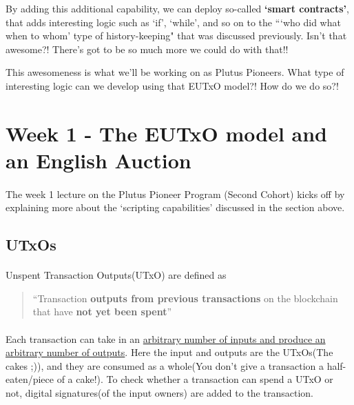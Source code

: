 \documentclass[a4paper, 11pt]{article}
\begin{document}
\begin{description}
        By adding this additional capability, we can deploy so-called \textbf{`smart contracts'}, that adds interesting logic such as `if', `while', and so on to the ```who did what when to whom' type of history-keeping" that was discussed previously. Isn't that awesome?! There's got to be so much more we could do with that!!

        This awesomeness is what we'll be working on as Plutus Pioneers. What type of interesting logic can we develop using that EUTxO model?! How do we do so?! 
    \end{description}
    


    \vspace{20px}
    \section{Week 1 - The EUTxO model and an English Auction}

    \paragraph{} The week 1 lecture on the Plutus Pioneer Program (Second Cohort) kicks off by explaining more about the `scripting capabilities' discussed in the section above.

    \subsection{UTxOs}
    \paragraph{} Unspent Transaction Outputs(UTxO) are defined as 

    \begin{quotation}
        ``Transaction \textbf{outputs from previous transactions} on the blockchain that have \textbf{not yet been spent}''
    \end{quotation}

    \paragraph{} Each transaction can take in an \ul{arbitrary number of inputs and produce an arbitrary number of outputs}. Here the input and outputs are the UTxOs(The cakes ;)), and they are consumed as a whole(You don't give a transaction a half-eaten/piece of a cake!). To check whether a transaction can spend a UTxO or not, digital signatures(of the input owners) are added to the transaction. 
    
\end{document}
